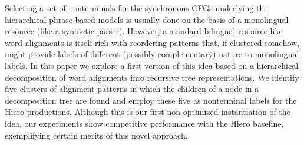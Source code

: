 Selecting a set of nonterminals for the synchronous CFGs underlying the hierarchical phrase-based models is usually done on the basis of a monolingual
 resource (like a syntactic parser). However, a standard bilingual resource like
 word alignments is itself rich with reordering patterns that, if clustered
 somehow, might provide labels of different (possibly complementary) nature to
 monolingual labels. In this paper we explore a first version of this idea based
 on a hierarchical decomposition of word alignments into recursive tree
 representations. We identify five clusters of alignment patterns in which the
 children of a node in a decomposition tree are found and employ these five as
 nonterminal labels for the Hiero productions. Although this is our first
 non-optimized instantiation of the idea, our experiments show competitive
 performance with the Hiero baseline, exemplifying certain merits of this novel
 approach.

